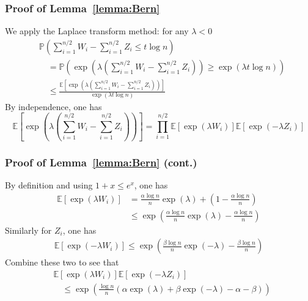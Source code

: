 \documentclass[compress,
mathserif,wide,%
]{beamer}
\begin{document}
\begin{frame}
	\frametitle{Proof of Lemma~\ref{lemma:Bern}}
	We apply the Laplace transform method: for any $\lambda<0$
\begin{align*}
&\mathbb{P}\left(\sum_{i=1}^{n/2}W_{i}-\sum_{i=1}^{n/2}Z_{i}\leq t\log n\right) \\
&\quad =\mathbb{P}\left(\exp\left(\lambda\left(\sum_{i=1}^{n/2}W_{i}-\sum_{i=1}^{n/2}Z_{i}\right)\right)\geq\exp\left(\lambda t\log n\right)\right)\\
 &\quad \leq\frac{\mathbb{E}\left[\exp\left(\lambda\left(\sum_{i=1}^{n/2}W_{i}-\sum_{i=1}^{n/2}Z_{i}\right)\right)\right]}{\exp\left(\lambda t\log n\right)}
\end{align*}
By independence, one has 
\[
\mathbb{E}\left[\exp\left(\lambda\left(\sum_{i=1}^{n/2}W_{i}-\sum_{i=1}^{n/2}Z_{i}\right)\right)\right]=\prod_{i=1}^{n/2}\mathbb{E}\left[\exp\left(\lambda W_{i}\right)\right]\mathbb{E}\left[\exp\left(-\lambda Z_{i}\right)\right]
\]

\end{frame}

\begin{frame}
	\frametitle{Proof of Lemma~\ref{lemma:Bern} (cont.)}
	By definition and using $1+ x \leq e^x$, one has 
\begin{align*}
\mathbb{E}\left[\exp\left(\lambda W_{i}\right)\right] & =\frac{\alpha\log n}{n}\exp\left(\lambda\right)+\left(1-\frac{\alpha\log n}{n}\right)\\
 & \leq\exp\left(\frac{\alpha\log n}{n}\exp\left(\lambda\right)-\frac{\alpha\log n}{n}\right)
\end{align*}
Similarly for $Z_{i}$, one has 
\begin{align*}
\mathbb{E}\left[\exp\left(-\lambda W_{i}\right)\right]   \leq\exp\left(\frac{\beta\log n}{n}\exp\left(-\lambda\right)-\frac{\beta\log n}{n}\right)
\end{align*}
Combine these two to see that 
\begin{align*}
&\mathbb{E}\left[\exp\left(\lambda W_{i}\right)\right]\mathbb{E}\left[\exp\left(-\lambda Z_{i}\right)\right] \\
&\quad\leq\exp\left(\frac{\log n}{n}\left(\alpha\exp\left(\lambda\right)+\beta\exp\left(-\lambda\right)-\alpha-\beta\right)\right)
\end{align*}

\end{frame}
\end{document}
